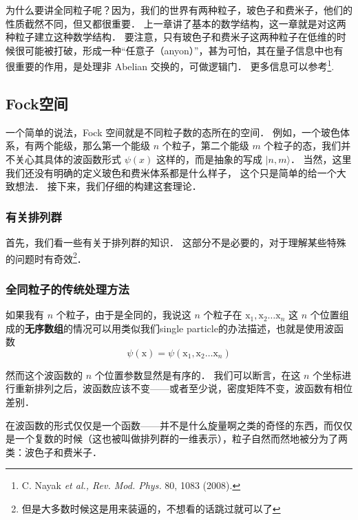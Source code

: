 
为什么要讲全同粒子呢？因为，我们的世界有两种粒子，玻色子和费米子，他们的性质截然不同，但又都很重要． 上一章讲了基本的数学结构，这一章就是对这两种粒子建立这种数学结构． 要注意，只有玻色子和费米子这两种粒子在低维的时候很可能被打破，形成一种“任意子（anyon）”，甚为可怕，其在量子信息中也有很重要的作用，是处理非 Abelian 交换的，可做逻辑门． 更多信息可以参考\footnote{C. Nayak \textsl{et al., Rev. Mod. Phys.} 80, 1083 (2008).}.

\subsection{Fock空间}

一个简单的说法，Fock 空间就是不同粒子数的态所在的空间． 例如，一个玻色体系，有两个能级，那么第一个能级 $n$ 个粒子，第二个能级 $m$ 个粒子的态，我们并不关心其具体的波函数形式 $\psi(x)$ 这样的，而是抽象的写成 $|n,m\rangle$． 当然，这里我们还没有明确的定义玻色和费米体系都是什么样子， 这个只是简单的给一个大致想法． 接下来，我们仔细的构建这套理论．

\subsubsection{有关排列群}

首先，我们看一些有关于排列群的知识． 这部分不是必要的，对于理解某些特殊的问题时有奇效\footnote{但是大多数时候这是用来装逼的，不想看的话跳过就可以了}．

\subsubsection{全同粒子的传统处理方法}

如果我有 $n$ 个粒子，由于是全同的，我说这 $n$ 个粒子在 ${\mathrm x}_1, {\mathrm x}_2 \dots {\mathrm x}_n$ 这 $n$ 个位置组成的\textbf{无序数组}的情况可以用类似我们single particle的办法描述，也就是使用波函数
\begin{equation}
\psi({\mathrm x}) = \psi({\mathrm x}_1, {\mathrm x}_2\dots {\mathrm x}_n)
\end{equation}

然而这个波函数的 $n$ 个位置参数显然是有序的． 我们可以断言，在这 $n$ 个坐标进行重新排列之后，波函数应该不变——或者至少说，密度矩阵不变，波函数有相位差别．

在波函数的形式仅仅是一个函数——并不是什么旋量啊之类的奇怪的东西，而仅仅是一个复数的时候（这也被叫做排列群的一维表示），粒子自然而然地被分为了两类：波色子和费米子．

